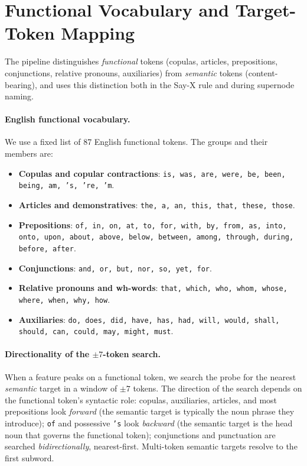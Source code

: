 \section{Functional Vocabulary and Target-Token Mapping}
\label{appx:funcvocab}

The pipeline distinguishes \emph{functional} tokens (copulas, articles, prepositions, conjunctions, relative pronouns, auxiliaries) from \emph{semantic} tokens (content-bearing), and uses this distinction both in the Say-X rule and during supernode naming.

\paragraph{English functional vocabulary.}
We use a fixed list of 87 English functional tokens. The groups and their members are:

\begin{itemize}\itemsep0pt
\item \textbf{Copulas and copular contractions}: \texttt{is, was, are, were, be, been, being, am, 's, 're, 'm}.
\item \textbf{Articles and demonstratives}: \texttt{the, a, an, this, that, these, those}.
\item \textbf{Prepositions}: \texttt{of, in, on, at, to, for, with, by, from, as, into, onto, upon, about, above, below, between, among, through, during, before, after}.
\item \textbf{Conjunctions}: \texttt{and, or, but, nor, so, yet, for}.
\item \textbf{Relative pronouns and wh-words}: \texttt{that, which, who, whom, whose, where, when, why, how}.
\item \textbf{Auxiliaries}: \texttt{do, does, did, have, has, had, will, would, shall, should, can, could, may, might, must}.
\end{itemize}

\paragraph{Directionality of the $\pm 7$-token search.}
When a feature peaks on a functional token, we search the probe for the nearest \emph{semantic} target in a window of $\pm 7$ tokens. The direction of the search depends on the functional token's syntactic role: copulas, auxiliaries, articles, and most prepositions look \emph{forward} (the semantic target is typically the noun phrase they introduce); \texttt{of} and possessive \texttt{'s} look \emph{backward} (the semantic target is the head noun that governs the functional token); conjunctions and punctuation are searched \emph{bidirectionally}, nearest-first. Multi-token semantic targets resolve to the first subword.


